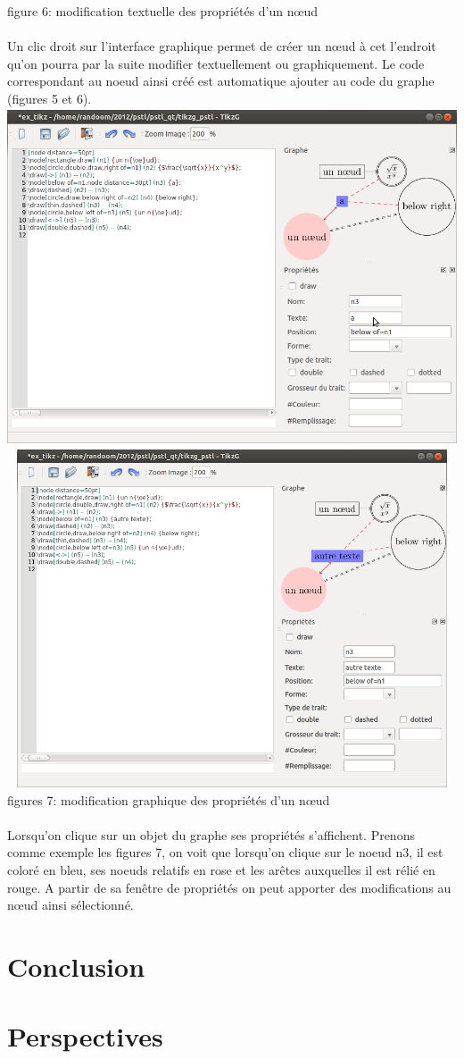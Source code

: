 \documentclass[a4paper]{report}
\begin{document}
figure 6: modification textuelle des propriétés d'un n{\oe}ud
\\
\\
Un clic droit sur l'interface graphique permet de créer un n{\oe}ud à cet l'endroit qu'on pourra par la suite modifier textuellement ou graphiquement. Le code correspondant au noeud ainsi créé est automatique ajouter au code du graphe (figures 5 et 6). 
\newline
  \includegraphics[width=15cm, height=10cm]{img/r_8.png} 
\\
  \includegraphics[width=15cm, height=10cm]{img/r_9.png}
\\ 
figures 7: modification graphique des propriétés d'un n{\oe}ud
\\
\\
Lorsqu'on clique sur un objet du graphe ses propriétés s'affichent. Prenons comme exemple les figures 7, on voit que lorsqu'on clique sur le noeud n3, il est coloré en bleu, ses noeuds relatifs en rose et les arêtes auxquelles il est rélié en rouge. A partir de sa fenêtre de propriétés on peut apporter des modifications au n{\oe}ud ainsi sélectionné. 
\section{Conclusion}
\section{Perspectives}
   
\end{document}
